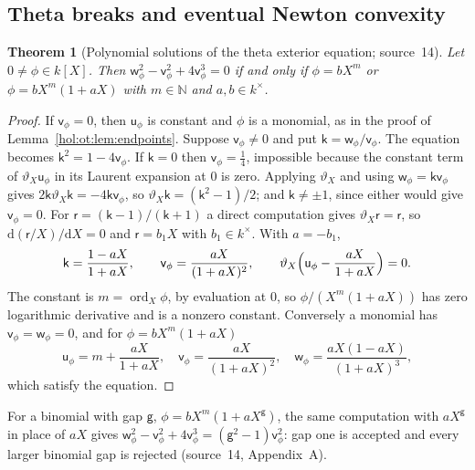 \documentclass[11pt]{article}
\numberwithin{equation}{section}
\newtheorem{theorem}{Theorem}[section]
\theoremstyle{definition}
\theoremstyle{remark}
\newcommand{\N}{\mathbb N}
\begin{document}
\subsection{Theta breaks and eventual Newton convexity}
\label{hol:ot:sub:convexity}

\begin{theorem}[Polynomial solutions of the theta exterior equation;
source~14]\label{hol:ot:thm:classification}
Let $0\ne\phi\in k[X]$. Then
$\mathsf w_\phi^2-\mathsf v_\phi^2+4\mathsf v_\phi^3=0$ if and only if
$\phi=bX^m$ or $\phi=bX^m(1+aX)$ with $m\in\N$ and $a,b\in k^\times$.
\end{theorem}

\begin{proof}
If $\mathsf v_\phi=0$, then $\mathsf u_\phi$ is constant and $\phi$ is a
monomial, as in the proof of Lemma~\ref{hol:ot:lem:endpoints}. Suppose
$\mathsf v_\phi\ne0$ and put $\mathsf k=\mathsf w_\phi/\mathsf v_\phi$. The
equation becomes $\mathsf k^2=1-4\mathsf v_\phi$. If $\mathsf k=0$ then
$\mathsf v_\phi=\frac14$, impossible because the constant term of
$\vartheta_X\mathsf u_\phi$ in its Laurent expansion at $0$ is zero. Applying
$\vartheta_X$ and using $\mathsf w_\phi=\mathsf k\mathsf v_\phi$ gives
$2\mathsf k\vartheta_X\mathsf k=-4\mathsf k\mathsf v_\phi$, so
$\vartheta_X\mathsf k=(\mathsf k^2-1)/2$; and $\mathsf k\ne\pm1$, since either
would give $\mathsf v_\phi=0$. For $\mathsf r=(\mathsf k-1)/(\mathsf k+1)$ a
direct computation gives $\vartheta_X\mathsf r=\mathsf r$, so
$\mathrm d(\mathsf r/X)/\mathrm dX=0$ and $\mathsf r=b_1X$ with $b_1\in
k^\times$. With $a=-b_1$,
\[
 \mathsf k=\frac{1-aX}{1+aX},\qquad \mathsf v_\phi=\frac{aX}{(1+aX)^2},\qquad
 \vartheta_X\Bigl(\mathsf u_\phi-\frac{aX}{1+aX}\Bigr)=0 .
\]
The constant is $m=\operatorname{ord}_X\phi$, by evaluation at $0$, so
$\phi/(X^m(1+aX))$ has zero logarithmic derivative and is a nonzero constant.
Conversely a monomial has $\mathsf v_\phi=\mathsf w_\phi=0$, and for
$\phi=bX^m(1+aX)$
\[
 \mathsf u_\phi=m+\frac{aX}{1+aX},\quad
 \mathsf v_\phi=\frac{aX}{(1+aX)^2},\quad
 \mathsf w_\phi=\frac{aX(1-aX)}{(1+aX)^3},
\]
which satisfy the equation.
\end{proof}

For a binomial with gap $\mathsf g$, $\phi=bX^m(1+aX^{\mathsf g})$, the same
computation with $aX^{\mathsf g}$ in place of $aX$ gives
$\mathsf w_\phi^2-\mathsf v_\phi^2+4\mathsf v_\phi^3
=(\mathsf g^2-1)\mathsf v_\phi^2$: gap one is accepted and every larger
binomial gap is rejected (source~14, Appendix~A).
\end{document}
